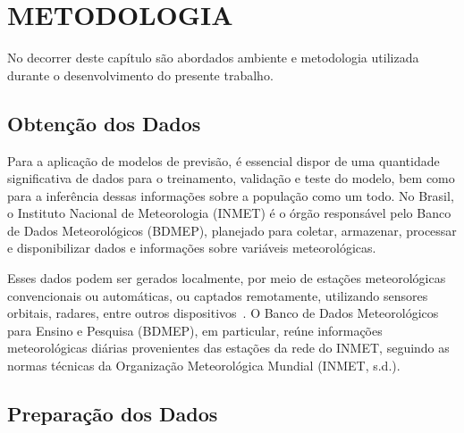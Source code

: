 \chapter{METODOLOGIA}

No decorrer deste capítulo são abordados ambiente e metodologia utilizada durante o
desenvolvimento do presente trabalho.

\section{Obtenção dos Dados}

Para a aplicação de modelos de previsão, é essencial dispor de uma quantidade significativa de dados para o 
treinamento, validação e teste do modelo, bem como para a inferência dessas informações sobre a população como um 
todo. No Brasil, o Instituto Nacional de Meteorologia (INMET) é o órgão responsável pelo Banco de Dados 
Meteorológicos (BDMEP), planejado para coletar, armazenar, processar e disponibilizar dados e informações sobre 
variáveis meteorológicas. 

Esses dados podem ser gerados localmente, por meio de estações meteorológicas convencionais ou automáticas, 
ou captados remotamente, utilizando sensores orbitais, radares, entre outros dispositivos~\cite{vianna2017}. 
O Banco de Dados Meteorológicos para Ensino e Pesquisa (BDMEP), em particular, reúne informações meteorológicas 
diárias provenientes das estações da rede do INMET, seguindo as normas técnicas da Organização Meteorológica 
Mundial (INMET, s.d.).
\section{Preparação dos Dados}